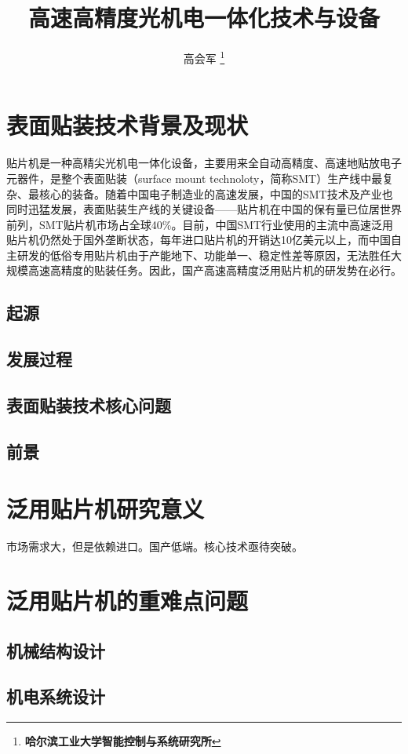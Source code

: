 \documentclass[a4paper]{article}%
\begin{document}
\begin{CJK}{UTF8}{gbsn}
\title{高速高精度光机电一体化技术与设备}
\author{高会军
\thanks{\textbf{哈尔滨工业大学智能控制与系统研究所}}
\date{\CurrentDate} %
}
\maketitle
\clearpage
\tableofcontents
\clearpage

\section{表面贴装技术背景及现状}
贴片机是一种高精尖光机电一体化设备，主要用来全自动高精度、高速地贴放电子元器件，是整个表面贴装（surface mount technoloty，简称SMT）生产线中最复杂、最核心的装备。随着中国电子制造业的高速发展，中国的SMT技术及产业也同时迅猛发展，表面贴装生产线的关键设备——贴片机在中国的保有量已位居世界前列，SMT贴片机市场占全球40\%。目前，中国SMT行业使用的主流中高速泛用贴片机仍然处于国外垄断状态，每年进口贴片机的开销达10亿美元以上，而中国自主研发的低俗专用贴片机由于产能地下、功能单一、稳定性差等原因，无法胜任大规模高速高精度的贴装任务。因此，国产高速高精度泛用贴片机的研发势在必行。
\subsection{起源}
\subsection{发展过程}
\subsection{表面贴装技术核心问题}
\subsection{前景}
\section{泛用贴片机研究意义}
市场需求大，但是依赖进口。国产低端。核心技术亟待突破。
\section{泛用贴片机的重难点问题}
\subsection{机械结构设计}
\subsection{机电系统设计}

\end{CJK}
\end{document}
